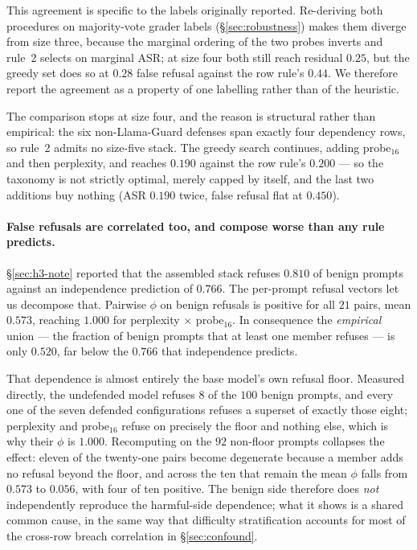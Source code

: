 This agreement is specific to the labels originally reported. Re-deriving both procedures on
majority-vote grader labels (\S\ref{sec:robustness}) makes them diverge from size three,
because the marginal ordering of the two probes inverts and rule~2 selects on marginal ASR; at
size four both still reach residual $0.25$, but the greedy set does so at $0.28$ false refusal
against the row rule's $0.44$. We therefore report the agreement as a property of one labelling
rather than of the heuristic.

The comparison stops at size four, and the reason is structural rather than empirical: the six
non-Llama-Guard defenses span exactly four dependency rows, so rule~2 admits no size-five
stack. The greedy search continues, adding probe$_{16}$ and then perplexity, and reaches
$0.190$ against the row rule's $0.200$ --- so the taxonomy is not strictly optimal, merely
capped by itself, and the last two additions buy nothing (ASR $0.190$ twice, false refusal
flat at $0.450$).

\paragraph{False refusals are correlated too, and compose worse than any rule predicts.}
\S\ref{sec:h3-note} reported that the assembled stack refuses $0.810$ of benign prompts
against an independence prediction of $0.766$. The per-prompt refusal vectors let us
decompose that. Pairwise $\phi$ on benign refusals is positive for all $21$ pairs, mean
$0.573$, reaching $1.000$ for perplexity $\times$ probe$_{16}$. In consequence the
\emph{empirical} union --- the fraction of benign prompts that at least one member refuses ---
is only $0.520$, far below the $0.766$ that independence predicts.

That dependence is almost entirely the base model's own refusal floor. Measured directly, the
undefended model refuses $8$ of the $100$ benign prompts, and every one of the seven defended
configurations refuses a superset of exactly those eight; perplexity and probe$_{16}$ refuse
on precisely the floor and nothing else, which is why their $\phi$ is $1.000$. Recomputing on
the $92$ non-floor prompts collapses the effect: eleven of the twenty-one pairs become
degenerate because a member adds no refusal beyond the floor, and across the ten that remain
the mean $\phi$ falls from $0.573$ to $0.056$, with four of ten positive. The benign side
therefore does \emph{not} independently reproduce the harmful-side dependence; what it shows
is a shared common cause, in the same way that difficulty stratification accounts for most of
the cross-row breach correlation in \S\ref{sec:confound}.

